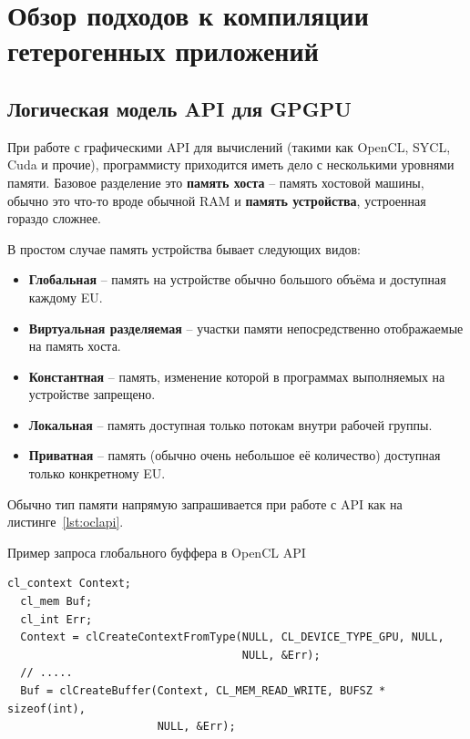 \chapter{Обзор подходов к компиляции гетерогенных приложений}\label{ch:overview}

\section{Логическая модель API для GPGPU}\label{sec:overview/api}

При работе с графическими API для вычислений (такими как OpenCL, SYCL, Cuda и прочие), программисту приходится иметь дело с несколькими уровнями памяти.
Базовое разделение это \textbf{память хоста} -- память хостовой машины, обычно это что-то вроде обычной RAM и \textbf{память устройства}, устроенная гораздо сложнее.

В простом случае память устройства бывает следующих видов:

\begin{itemize}
\item \textbf{Глобальная} -- память на устройстве обычно большого объёма и доступная каждому EU.
\item \textbf{Виртуальная разделяемая} -- участки памяти непосредственно отображаемые на память хоста.
\item \textbf{Константная} -- память, изменение которой в программах выполняемых на устройстве запрещено.
\item \textbf{Локальная} -- память доступная только потокам внутри рабочей группы.
\item \textbf{Приватная} -- память (обычно очень небольшое её количество) доступная только конкретному EU.
\end{itemize}

Обычно тип памяти напрямую запрашивается при работе с API как на листинге~\cref{lst:oclapi}.

\begin{ListingEnv}[!h]
    \captiondelim{ } 
    \caption{Пример запроса глобального буффера в OpenCL API}\label{lst:oclapi}
    \begin{lstlisting}[language={[ISO]C++}]
  cl_context Context;
  cl_mem Buf;
  cl_int Err;
  Context = clCreateContextFromType(NULL, CL_DEVICE_TYPE_GPU, NULL, 
                                    NULL, &Err);
  // .....
  Buf = clCreateBuffer(Context, CL_MEM_READ_WRITE, BUFSZ * sizeof(int), 
                       NULL, &Err);
    \end{lstlisting}
\end{ListingEnv}

